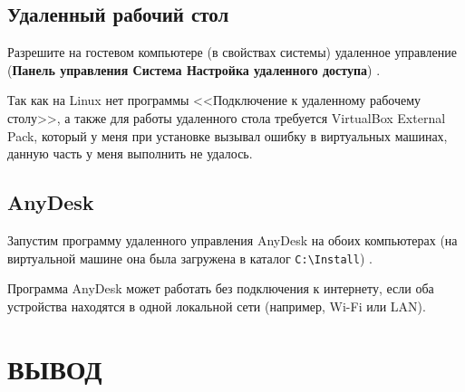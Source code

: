 \subsection{Удаленный рабочий стол}

Разрешите на гостевом компьютере (в свойствах системы) удаленное управление
(\textbf{Панель управления \rarrow Система
\rarrow Настройка удаленного доступа})
.

\begin{image}
	\caption{Настройка удаленного доступа}
	\label{fig:remote:desctop:on}
\end{image}

Так как на Linux нет программы <<Подключение к удаленному рабочему столу>>,
а также для работы удаленного стола требуется VirtualBox External Pack,
который у меня при установке вызывал ошибку в виртуальных машинах,
данную часть у меня выполнить не удалось.

\subsection{AnyDesk}

Запустим программу удаленного управления AnyDesk на обоих компьютерах
(на виртуальной машине она была загружена в каталог \verb|C:\Install|)
.

\begin{image}
	\caption{Каталог Install с программой AnyDesk}
	\label{fig:anydesk}
\end{image}

\begin{image}
	\caption{Открытое приложение AnyDesk}
	\label{fig:anydesk:start}
\end{image}

\begin{image}
	\caption{Запущеное приложение AnyDesk}
	\label{fig:anydesk:run}
\end{image}

Программа AnyDesk может работать без подключения к интернету,
если оба устройства находятся в одной локальной сети
(например, Wi-Fi или LAN).

\clearpage

\section*{ВЫВОД}


